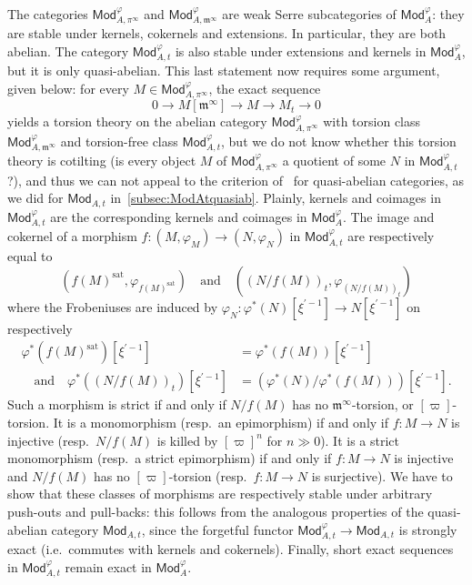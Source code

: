 \documentclass[11pt]{article}
\theoremstyle{definition}
\numberwithin{equation}{section}
\numberwithin{figure}{section}
\numberwithin{table}{section}
\newcommand{\Mod}{\mathsf{Mod}}
\begin{document}
The categories $\Mod_{A,\pi^{\infty}}^{\varphi}$ and $\Mod_{A,\mathfrak{m}^{\infty}}^{\varphi}$ are weak Serre subcategories of $\Mod_{A}^{\varphi}$: they are stable under kernels, cokernels and extensions. In particular, they are both abelian. The category $\Mod_{A,t}^{\varphi}$ is also stable under extensions and kernels in $\Mod_{A}^{\varphi}$, but it is only quasi-abelian. This last statement now requires some argument, given below: for every $M\in\Mod_{A,\pi^{\infty}}^{\varphi}$, the exact sequence
\[
0\rightarrow M[\mathfrak{m}^{\infty}]\rightarrow M\rightarrow M_{t}\rightarrow0
\]
yields a torsion theory on the abelian category $\Mod_{A,\pi^{\infty}}^{\varphi}$ with torsion class $\Mod_{A,\mathfrak{m}^{\infty}}^{\varphi}$ and torsion-free class $\Mod_{A,t}^{\varphi}$, but we do not know whether this torsion theory is cotilting (is every object $M$ of $\Mod_{A,\pi^{\infty}}^{\varphi}$ a quotient of some $N$ in $\Mod_{A,t}^{\varphi}$?), and thus we can not appeal to the criterion of~\cite[B.3]{BoVdB03} for quasi-abelian categories, as we did for $\Mod_{A,t}$ in~\ref{subsec:ModAtquasiab}. Plainly, kernels and coimages in $\Mod_{A,t}^{\varphi}$ are the corresponding kernels and coimages in $\Mod_{A}^{\varphi}$. The image and cokernel of a morphism $f:(M,\varphi_{M})\rightarrow(N,\varphi_{N})$ in $\Mod_{A,t}^{\varphi}$ are respectively equal to
\[
\left(f(M)^{\mathrm{sat}},\varphi_{f(M)^{\mathrm{sat}}}\right)\quad\text{and}\quad\left(\left(N/f(M)\right)_{t},\varphi_{(N/f(M))_{t}}\right)
\]
where the Frobeniuses are induced by $\varphi_{N}:\varphi^{\ast}(N)[\xi^{\prime-1}]\rightarrow N[\xi^{\prime-1}]$ on respectively
\begin{align*}
\varphi^{\ast}\left(f(M)^{\mathrm{sat}}\right)[\xi^{\prime-1}] & = \varphi^{\ast}\left(f(M)\right)[\xi^{\prime-1}]\\
\quad\text{and}\quad\varphi^{\ast}\left(\left(N/f(M)\right)_{t}\right)[\xi^{\prime-1}] & = \left(\varphi^{\ast}\left(N\right)/\varphi^{\ast}\left(f(M)\right)\right)[\xi^{\prime-1}].
\end{align*}
Such a morphism is strict if and only if $N/f(M)$ has no $\mathfrak{m}^{\infty}$-torsion, or $[\varpi]$-torsion. It is a monomorphism (resp.~an epimorphism) if and only if $f:M\rightarrow N$ is injective (resp.~$N/f(M)$ is killed by $[\varpi]^{n}$ for $n\gg0$). It is a strict monomorphism (resp.~a strict epimorphism) if and only if $f:M\rightarrow N$ is injective and $N/f(M)$ has no $[\varpi]$-torsion (resp.~$f:M\rightarrow N$ is surjective). We have to show that these classes of morphisms are respectively stable under arbitrary push-outs and pull-backs: this follows from the analogous properties of the quasi-abelian category $\Mod_{A,t}$, since the forgetful functor $\Mod_{A,t}^{\varphi}\rightarrow\Mod_{A,t}$ is strongly exact (i.e.~commutes with kernels and cokernels). Finally, short exact sequences in $\Mod_{A,t}^{\varphi}$ remain exact in $\Mod_{A}^{\varphi}$.
\end{document}
